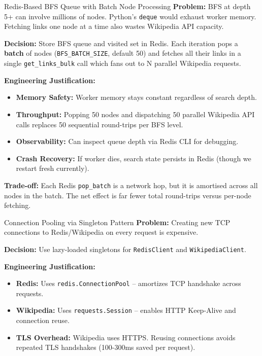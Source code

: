 \documentclass[11pt,a4paper]{article}
\begin{document}
\begin{decisionbox}{Redis-Based BFS Queue with Batch Node Processing}
\textbf{Problem:} BFS at depth 5+ can involve millions of nodes. Python's \texttt{deque} would exhaust worker memory. Fetching links one node at a time also wastes Wikipedia API capacity.

\textbf{Decision:} Store BFS queue and visited set in Redis. Each iteration pops a \textbf{batch} of nodes (\texttt{BFS\_BATCH\_SIZE}, default 50) and fetches all their links in a single \texttt{get\_links\_bulk} call which fans out to N parallel Wikipedia requests.

\textbf{Engineering Justification:}
\begin{itemize}[leftmargin=*, nosep]
    \item \textbf{Memory Safety:} Worker memory stays constant regardless of search depth.
    \item \textbf{Throughput:} Popping 50 nodes and dispatching 50 parallel Wikipedia API calls replaces 50 sequential round-trips per BFS level.
    \item \textbf{Observability:} Can inspect queue depth via Redis CLI for debugging.
    \item \textbf{Crash Recovery:} If worker dies, search state persists in Redis (though we restart fresh currently).
\end{itemize}

\textbf{Trade-off:} Each Redis \texttt{pop\_batch} is a network hop, but it is amortised across all nodes in the batch. The net effect is far fewer total round-trips versus per-node fetching.
\end{decisionbox}

\begin{decisionbox}{Connection Pooling via Singleton Pattern}
\textbf{Problem:} Creating new TCP connections to Redis/Wikipedia on every request is expensive.

\textbf{Decision:} Use lazy-loaded singletons for \texttt{RedisClient} and \texttt{WikipediaClient}.

\textbf{Engineering Justification:}
\begin{itemize}[leftmargin=*, nosep]
    \item \textbf{Redis:} Uses \texttt{redis.ConnectionPool} -- amortizes TCP handshake across requests.
    \item \textbf{Wikipedia:} Uses \texttt{requests.Session} -- enables HTTP Keep-Alive and connection reuse.
    \item \textbf{TLS Overhead:} Wikipedia uses HTTPS. Reusing connections avoids repeated TLS handshakes (100-300ms saved per request).
\end{itemize}
\end{decisionbox}
\end{document}
